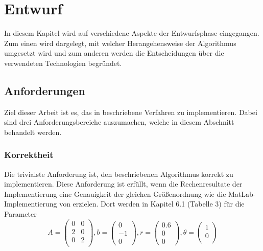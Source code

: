 \chapter{Entwurf}\label{desgin}
In diesem Kapitel wird auf verschiedene Aspekte der Entwurfsphase eingegangen.
Zum einen wird dargelegt, mit welcher Herangehensweise der Algorithmus umgesetzt wird und zum anderen werden die Entscheidungen über die verwendeten Technologien begründet.

\section{Anforderungen}

Ziel dieser Arbeit ist es, das in \cite*[]{gasperini:hal-03209144} beschriebene Verfahren zu implementieren.
Dabei sind drei Anforderungsbereiche auszumachen, welche in diesem Abschnitt behandelt werden.


\subsection{Korrektheit}

Die trivialste Anforderung ist, den beschriebenen Algorithmus korrekt zu implementieren.
Diese Anforderung ist erfüllt, wenn die Rechenresultate der Implementierung eine Genauigkeit der gleichen Größenordnung wie die MatLab-Implementierung von \cite*[]{gasperini:hal-03209144} erzielen.
Dort werden in Kapitel 6.1 (Tabelle 3) für die Parameter 
\begin{equation}
    A = \begin{pmatrix}
        0 & 0 \\
        2 & 0 \\
        0 & 2 \\
    \end{pmatrix}, b = \begin{pmatrix}
        0 \\ -1 \\ 0
    \end{pmatrix},
    r = \begin{pmatrix}
        0.6 \\ 0 \\0 
    \end{pmatrix},
    \theta = \begin{pmatrix}
        1 \\ 0 \\
    \end{pmatrix}
\end{equation}

